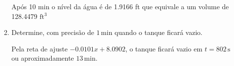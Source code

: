 \documentclass[a4paper, 11pt]{report}
\begin{document}
\begin{enumerate}[leftmargin=*]
\begin{enumerate}[leftmargin=*, label=\alph*.]
\begin{minipage}{0.63\columnwidth}
            \begin{center}
                \begin{minipage}{0.75\columnwidth}
                    Após 10 min o nível da água é de 1.9166 ft que equivale a um volume de 128.4479 $\mathrm{ft^3}$
                \end{minipage}
            \end{center}
        \end{minipage}
        \vspace{5pt}

        \item Determine, com precisão de $1 \,\mathrm{min}$ quando o tanque ficará vazio.

        Pela reta de ajuste $-0.0101x + 8.0902$, o tanque ficará vazio em $t = 802 \,\mathrm{s}$ ou aproximadamente $13 \,\mathrm{min}$.
    \end{enumerate}
\end{enumerate}
\setcounter{section}{8}
\end{document}
